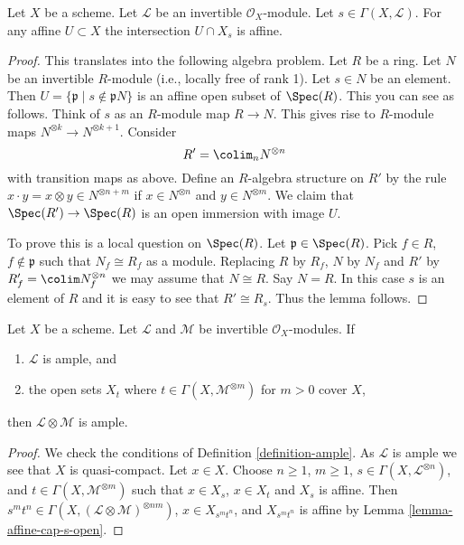 \begin{lemma}
\label{lemma-affine-cap-s-open}
Let $X$ be a scheme. Let $\mathcal{L}$ be an invertible $\mathcal{O}_X$-module.
Let $s \in \Gamma(X, \mathcal{L})$. For any affine $U \subset X$
the intersection $U \cap X_s$ is affine.
\end{lemma}

\begin{proof}
This translates into the following algebra problem.
Let $R$ be a ring. Let $N$ be an invertible $R$-module
(i.e., locally free of rank 1). Let $s \in N$ be an element.
Then $U = \{\mathfrak p \mid s \not \in \mathfrak p N\}$ is
an affine open subset of $\Spec(R)$. This you can see
as follows. Think of $s$ as an $R$-module map $R \to N$.
This gives rise to $R$-module maps $N^{\otimes k} \to N^{\otimes k + 1}$.
Consider
$$
R' = \colim_n N^{\otimes n}
$$
with transition maps as above. Define an $R$-algebra structure on $R'$ by
the rule $x \cdot y = x \otimes y \in N^{\otimes n + m}$
if $x \in N^{\otimes n}$ and $y \in N^{\otimes m}$. We claim that
$\Spec(R') \to \Spec(R)$ is an open immersion with
image $U$.

\medskip\noindent
To prove this is a local question on $\Spec(R)$.
Let $\mathfrak p \in \Spec(R)$. Pick $f \in R$,
$f \not \in \mathfrak p$ such that $N_f \cong R_f$ as a module.
Replacing $R$ by $R_f$, $N$ by $N_f$ and $R'$ by
$R'_f = \colim N_f^{\otimes n}$ we may assume that $N \cong R$.
Say $N = R$. In this case $s$ is an element of $R$ and it is
easy to see that $R' \cong R_s$. Thus the lemma follows.
\end{proof}

\begin{lemma}
\label{lemma-ample-tensor-globally-generated}
\begin{reference}
\cite[II Proposition 4.5.6(ii)]{EGA}
\end{reference}
Let $X$ be a scheme. Let $\mathcal{L}$ and $\mathcal{M}$
be invertible $\mathcal{O}_X$-modules. If
\begin{enumerate}
\item $\mathcal{L}$ is ample, and
\item the open sets $X_t$ where $t \in \Gamma(X, \mathcal{M}^{\otimes m})$
for $m > 0$ cover $X$,
\end{enumerate}
then $\mathcal{L} \otimes \mathcal{M}$ is ample.
\end{lemma}

\begin{proof}
We check the conditions of Definition \ref{definition-ample}.
As $\mathcal{L}$ is ample we see that $X$ is quasi-compact.
Let $x \in X$. Choose $n \geq 1$, $m \geq 1$,
$s \in \Gamma(X, \mathcal{L}^{\otimes n})$, and
$t \in \Gamma(X, \mathcal{M}^{\otimes m})$
such that $x \in X_s$, $x \in X_t$ and $X_s$ is affine.
Then $s^mt^n \in \Gamma(X, (\mathcal{L} \otimes \mathcal{M})^{\otimes nm})$,
$x \in X_{s^mt^n}$, and $X_{s^mt^n}$ is affine by
Lemma \ref{lemma-affine-cap-s-open}.
\end{proof}

